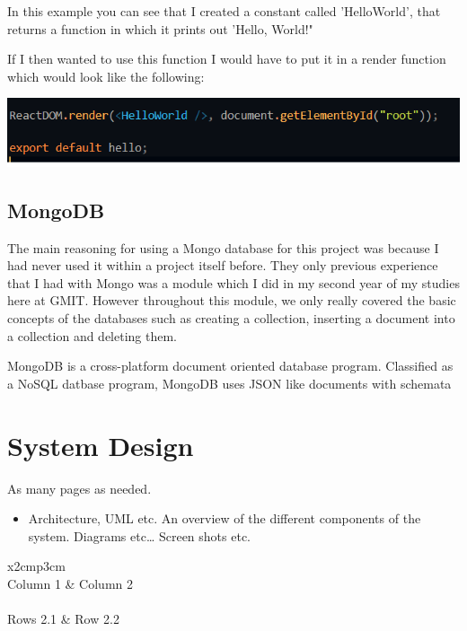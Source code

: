 In this example you can see that I created a constant called 'HelloWorld', that returns a function in which it prints out 'Hello, World!"

If I then wanted to use this function I would have to put it in a render function which would look like the following:
\begin{center}    
\includegraphics{img/hello.png}
\end{center}

\section{MongoDB}
The main reasoning for using a Mongo database for this project was because I had never used it within a project itself before. They only previous experience that I had with Mongo was a module which I did in my second year of my studies here at GMIT. However throughout this module, we only really covered the basic concepts of the databases such as creating a collection, inserting a document into a collection and deleting them.

MongoDB is a cross-platform document oriented database program. Classified as a NoSQL datbase program, MongoDB uses JSON like documents with schemata\cite{MongoDB}

\chapter{System Design}
As many pages as needed.
\begin{itemize}
\item Architecture, UML etc. An overview of the different components of the system. Diagrams etc… Screen shots etc.
\end{itemize}

\begin{table}[h]
  \centering
  \begin{tabular}{x{2cm}p{3cm}}
    \toprule \\
    Column 1 & Column 2 \\
    \midrule \\
    Rows 2.1 & Row 2.2 \\
    \bottomrule
  \end{tabular}
  \caption{A table.}
  \label{table:mytable}
\end{table}

